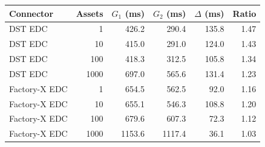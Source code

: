 \begin{tabular}{lrrrrr}
    \toprule
    Connector & Assets & $G_1$ (ms) & $G_2$ (ms) & $\Delta$ (ms) & Ratio \\
    \midrule
    DST EDC & 1 & 426.2 & 290.4 & 135.8 & 1.47 \\
    DST EDC & 10 & 415.0 & 291.0 & 124.0 & 1.43 \\
    DST EDC & 100 & 418.3 & 312.5 & 105.8 & 1.34 \\
    DST EDC & 1000 & 697.0 & 565.6 & 131.4 & 1.23 \\
    Factory-X EDC & 1 & 654.5 & 562.5 & 92.0 & 1.16 \\
    Factory-X EDC & 10 & 655.1 & 546.3 & 108.8 & 1.20 \\
    Factory-X EDC & 100 & 679.6 & 607.3 & 72.3 & 1.12 \\
    Factory-X EDC & 1000 & 1153.6 & 1117.4 & 36.1 & 1.03 \\
    \bottomrule
\end{tabular}

